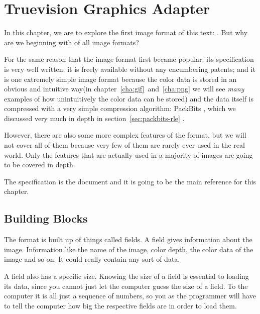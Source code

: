 \begin{comment}
  
\end{comment}

\chapter{Truevision Graphics Adapter}
\label{cha:tga}

In this chapter, we are to explore the first image format of this
text: \tga. But why are we beginning with \tga of all image formats?

For the same reason that the image format first became popular: its
specification is very well written; it is freely available without any
encumbering patents; and it is one extremely simple image format
because the color data is stored in an obvious and intuitive way(in
chapter~\ref{cha:gif}~and~\ref{cha:png} we will see \textit{many}
examples of how unintuitively the color data can be stored) and the
data itself is compressed with a very simple compression algorithm:
PackBits \rle, which we discussed very much in depth in
section~\ref{sec:packbits-rle} \cite{murray1996encyclopedia}.

However, there are also some more complex features of the \tga format,
but we will not cover all of them because very few of them are rarely ever
used in the real world. Only the features that are actually used in a
majority of \tga images are going to be covered in depth.

The \tga specification is the document
\cite{91:_truev_tga_file_format_specif} and it is going to be the main
reference for this chapter.

\section{Building Blocks}

The \tga format is built up of things called fields. A field gives
information about the image. Information like the name of the image,
color depth, the color data of the image and so on. It could really
contain any sort of data.

A field also has a specific size. Knowing the size of a field is
essential to loading its data, since you cannot just let the computer
guess the size of a field. To the computer it is all just a sequence
of numbers, so you as the programmer will have to tell the computer
how big the respective fields are in order to load them.

